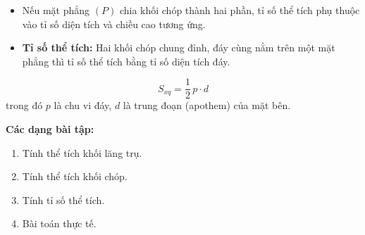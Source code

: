 \documentclass[12pt,a4paper]{article}
\begin{document}
\begin{tinhchat}
  \begin{itemize}
    \item Nếu mặt phẳng $(P)$ chia khối chóp thành hai phần, tỉ số thể tích phụ thuộc vào tỉ số diện tích và chiều cao tương ứng.
    \item \textbf{Tỉ số thể tích:} Hai khối chóp chung đỉnh, đáy cùng nằm trên một mặt phẳng thì tỉ số thể tích bằng tỉ số diện tích đáy.
  \end{itemize}
\end{tinhchat}

\begin{congthuc}[title={Diện tích xung quanh hình chóp đều}]
  \[
    S_{xq} = \dfrac{1}{2}\,p \cdot d
  \]
  trong đó $p$ là chu vi đáy, $d$ là trung đoạn (apothem) của mặt bên.
\end{congthuc}

\medskip\noindent\textbf{Các dạng bài tập:}
\begin{enumerate}[label=\textbf{Dạng \arabic*:}, leftmargin=*, align=left]
  \item Tính thể tích khối lăng trụ.
  \item Tính thể tích khối chóp.
  \item Tính tỉ số thể tích.
  \item Bài toán thực tế.
\end{enumerate}
\end{document}
